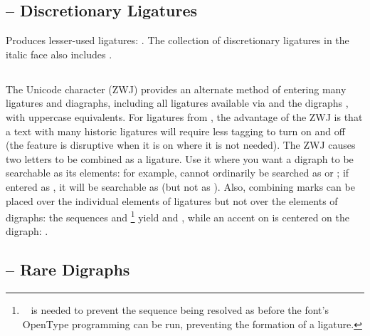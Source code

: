 \subsection{ –
Discretionary Ligatures}
Produces lesser-used ligatures:
.
The collection of discretionary ligatures in the italic face also includes
.


\subsection{ }\hypertarget{zwj}{}

The Unicode character   (ZWJ) provides an
alternate method of entering many ligatures and diagraphs, including all ligatures
available via  and the digraphs ,
with uppercase equivalents. For ligatures from
, the advantage of the ZWJ is that a text with many historic
ligatures will require less tagging to turn  on and off (the
feature is disruptive when it is on where it is not needed). The ZWJ causes two
letters to be combined as a ligature.  Use it where you want a digraph to be searchable
as its elements: for example,   cannot
ordinarily be searched as  or ; if entered as , it will be searchable as  (but not as ).
Also, combining marks can be placed over the individual elements of ligatures but not
over the elements of digraphs: the sequences  and \footnote{\   is needed to
prevent the sequence  being resolved as 
before the font’s OpenType programming can be run, preventing the formation of a
ligature.} yield  and
, while an accent on  is
centered on the digraph: .


\subsection{ – Rare
Digraphs}\hypertarget{ss17}{}


